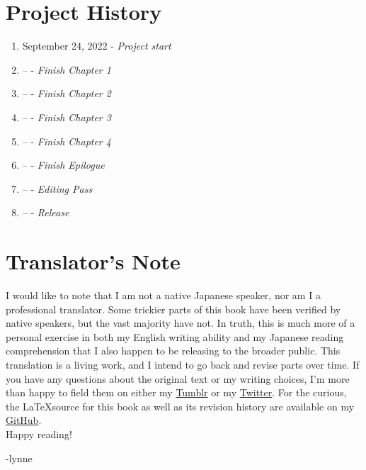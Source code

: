 \section*{Project History}
\begin{enumerate}
	\item September 24, 2022 - \emph{Project start}
	\item -- - \emph{Finish Chapter 1}
	\item -- - \emph{Finish Chapter 2}
	\item -- - \emph{Finish Chapter 3}
	\item -- - \emph{Finish Chapter 4}
	\item -- - \emph{Finish Epilogue}
	\item -- - \emph{Editing Pass}
	\item -- - \emph{Release}
\end{enumerate}

\section*{Translator's Note}
I would like to note that I am not a native Japanese speaker, nor am I a professional translator. Some trickier parts of this book have been verified by native speakers, but the vast majority have not. In truth, this is much more of a personal exercise in both my English writing ability and my Japanese reading comprehension that I also happen to be releasing to the broader public. This translation is a living work, and I intend to go back and revise parts over time. If you have any questions about the original text or my writing choices, I'm more than happy to field them on either my \href{https://plvpwaa.tumblr.com}{Tumblr} or my \href{https://twitter.com/plvpwaa}{Twitter}. For the curious, the \LaTeX \space source for this book as well as its revision history are available on my \href{https://github.com/Spirati/translation-octopath}{GitHub}. 
\\

Happy reading!

-lynne